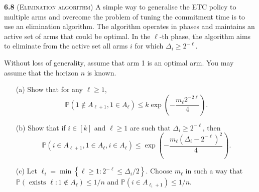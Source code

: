 \noindent\textbf{6.8} (\textsc{Elimination algorithm})
A simple way to generalise the ETC policy to multiple arms and overcome the problem of tuning the commitment time is to use an elimination algorithm.
The algorithm operates in phases and maintains an active set of arms that could be optimal.
In the $\ell$-th phase, the algorithm aims to eliminate from the active set all arms $i$ for which $\Delta_{i} \geq 2^{-\ell}$.

Without loss of generality, assume that arm 1 is an optimal arm.
You may assume that the horizon $n$ is known.

\begin{enumerate}
    \item[(a)] Show that for any $\ell \geq 1$,
    $$\mathbb{P}\left(1 \notin A_{\ell+1}, 1 \in A_{\ell}\right) \leq k \exp \left(-\frac{m_{\ell} 2^{-2 \ell}}{4}\right).$$

    \item[(b)] Show that if $i \in[k]$ and $\ell \geq 1$ are such that $\Delta_{i} \geq 2^{-\ell}$, then
    $$\mathbb{P}\left(i \in A_{\ell+1}, 1 \in A_{\ell}, i \in A_{\ell}\right) \leq \exp \left(-\frac{m_{\ell}\left(\Delta_{i}-2^{-\ell}\right)^{2}}{4}\right).$$ 
    
    \item[(c)] Let $\ell_{i}=\min \left\{\ell \geq 1: 2^{-\ell} \leq \Delta_{i} / 2\right\}$.
    Choose $m_\ell$ in such a way that $\mathbb{P}\left(\text { exists } \ell: 1 \notin A_{\ell}\right) \leq 1 / n$ and $\mathbb{P}\left(i \in A_{\ell_{i}+1}\right) \leq 1 / n$.
\end{enumerate}

